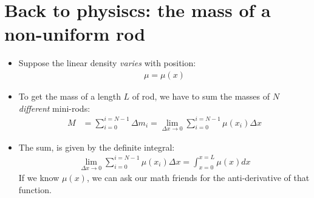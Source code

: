 \documentclass[aspectratio=169,
hyperref={colorlinks,urlcolor=blue}
]{beamer}
\begin{document}
\section{Back to physiscs: the mass of a non-uniform rod}
\label{btpnonunirodmass}
{
\begin{itemize}
\scriptsize
\item Suppose the linear density \emph{varies} with position:
\begin{align*}
\mu = \mu(x)
\end{align*}
\item To get the mass of a length $L$ of rod, we have to sum the masses of $N$ \emph{different} mini-rods:
\begin{align*}
M &=\sum_{i=0}^{i=N-1}\Delta m_i =\lim_{\Delta x\to 0} \sum_{i=0}^{i=N-1} \mu(x_i) \Delta x
\end{align*}
\item The sum, is given by the definite integral:
\begin{align*}
\lim_{\Delta x\to 0} \sum_{i=0}^{i=N-1} \mu(x_i) \Delta x=\int_{x=0}^{x=L}\mu(x)dx
\end{align*}
If we know $\mu(x)$, we can ask our math friends for the anti-derivative of that function.
\end{itemize}

}
\end{document}
